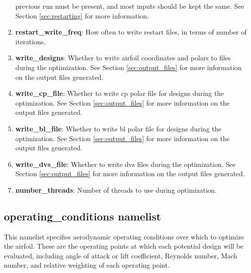\documentclass[11pt]{article}
\begin{document}
\begin{enumerate}
{	previous run must be present, and most inputs should be kept the same. See Section 
	\ref{sec:restarting} for more information.}
\item{\textbf{restart\_write\_freq}: How often to write restart files, in terms of number
	of iterations.}
\item{\textbf{write\_designs}: Whether to write airfoil coordinates and polars to files
	during the optimization.  See Section \ref{sec:output_files} for more information on the
	output files generated.}
\item{\textbf{write\_cp\_file}: Whether to write cp polar file for designs during the optimization. 
	See Section \ref{sec:output_files} for more information on the output files generated.}
\item{\textbf{write\_bl\_file}: Whether to write bl polar file for designs during the optimization. 
	See Section \ref{sec:output_files} for more information on the output files generated.}
\item{\textbf{write\_dvs\_file}: Whether to write dvs files during the optimization. 
	See Section \ref{sec:output_files} for more information on the output files generated.}
\item{\textbf{number\_threads}: Number of threads to use during optimization.}
\end{enumerate}

\subsection{operating\_conditions namelist}

This namelist specifies aerodynamic operating conditions over which to optimize the
airfoil. These are the operating points at which each potential design will be evaluated,
including angle of attack or lift coefficient, Reynolds number, Mach number, and
relative weighting of each operating point.
\end{document}
